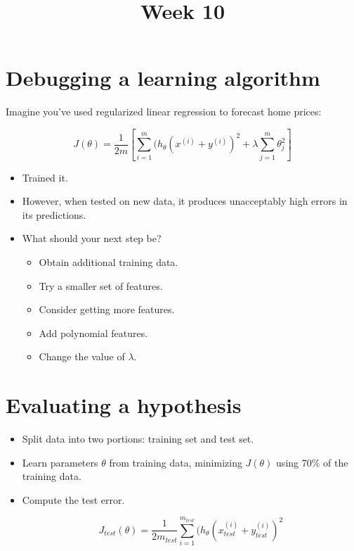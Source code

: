 \documentclass{article}
\title{Week 10}
\begin{document}
\maketitle
\newpage
{}

\section*{Debugging a learning algorithm}

Imagine you've used regularized linear regression to forecast home prices:

$$J(\theta) = \frac{1}{2m} [ \sum_{i=1}^{m}(h_{\theta}(x^{(i)} + y^{(i)})^2 + \lambda \sum_{j=1}^{m} \theta_j^2] $$

\begin{itemize}
  \item Trained it.
  \item However, when tested on new data, it produces unacceptably high errors in its predictions.
  \item What should your next step be?
        \begin{itemize}
          \item Obtain additional training data.
          \item Try a smaller set of features.
          \item Consider getting more features.
          \item Add polynomial features.
          \item Change the value of $\lambda$.
        \end{itemize}

\end{itemize}

\section*{Evaluating a hypothesis}

\begin{itemize}
  \item Split data into two portions: training set and test set.
  \item Learn parameters $\theta$ from training data, minimizing $J(\theta)$ using 70\% of the training data.
  \item Compute the test error.

        $$J_{test}(\theta) = \frac{1}{2m_{test}}  \sum_{i=1}^{m_{test}}(h_{\theta}(x^{(i)}_{test} + y^{(i)}_{test})^2$$

\end{itemize}
\end{document}
